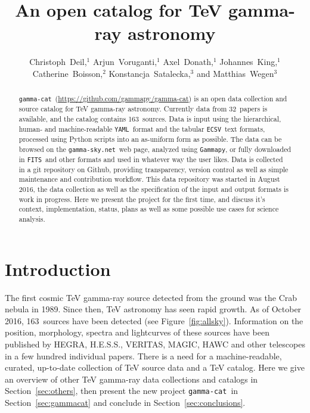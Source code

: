 \documentclass[11pt,twoside]{article}
\newcommand{\gammacat}{\texttt{gamma-cat}}
\newcommand{\gammapy}{\texttt{Gammapy}}
\newcommand{\gammasky}{\texttt{gamma-sky.net}}
\newcommand{\nsources}{163}
\newcommand{\npapers}{32}
\newcommand{\yaml}{\texttt{YAML}}
\newcommand{\ecsv}{\texttt{ECSV}}
\newcommand{\fits}{\texttt{FITS}}
\newcommand{\gammacatgh}{\url{https://github.com/gammapy/gamma-cat}}
\begin{document}
\title{An open catalog for TeV gamma-ray astronomy}

\author{Christoph~Deil,$^1$
Arjun~Voruganti,$^1$
Axel~Donath,$^1$
Johannes~King,$^1$
Catherine~Boisson,$^2$
Konstancja~Satalecka,$^3$
and Matthias~Wegen$^3$
}


\begin{abstract} \gammacat\ (\gammacatgh) is an open data collection and source
catalog for TeV gamma-ray astronomy. Currently data from \npapers~papers is
available, and the catalog contains \nsources~sources. Data is input using the
hierarchical, human- and machine-readable \yaml\ format and the tabular \ecsv\
text formats, processed using Python scripts into an as-uniform form as
possible. The data can be browsed on the \gammasky~web page, analyzed using
\gammapy, or fully downloaded in \fits\ and other formats and used in whatever
way the user likes. Data is collected in a git repository on Github, providing
transparency, version control as well as simple maintenance and contribution
workflow. This data repository was started in August 2016, the data collection
as well as the specification of the input and output formats is work in
progress. Here we present the project for the first time, and discuss it's
context, implementation, status, plans as well as some possible use cases for
science analysis. \end{abstract}

\section{Introduction}

The first cosmic TeV gamma-ray source detected from the ground was the Crab
nebula in 1989. Since then, TeV astronomy has seen rapid growth. As of October
2016, \nsources~sources have been detected (see Figure~\ref{fig:allsky}).
Information on the position, morphology, spectra and lightcurves of these
sources have been published by HEGRA, H.E.S.S., VERITAS, MAGIC, HAWC and other
telescopes in a few hundred individual papers. There is a need for a
machine-readable, curated, up-to-date collection of TeV source data and a TeV
catalog. Here we give an overview of other TeV gamma-ray data collections and
catalogs in Section~\ref{sec:others}, then present the new project \gammacat\ in
Section~\ref{sec:gammacat} and conclude in Section~\ref{sec:conclusions}.
\end{document}
